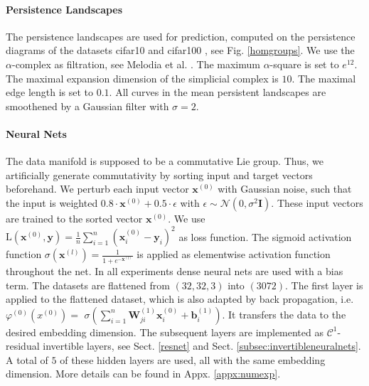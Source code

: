\documentclass[envcountsect,runningheads]{llncs}
\begin{document}
\paragraph{Persistence Landscapes} The persistence landscapes are used for prediction, computed on the persistence diagrams of the datasets cifar10 and cifar100 , see Fig. \ref{homgroups}. We use the $\alpha$-complex as filtration, see Melodia et al. . The maximum $\alpha$-square is set to $e^{12}$. The maximal expansion dimension of the simplicial complex is $10$. The maximal edge length is set to $0.1$. All curves in the mean persistent landscapes are smoothened by a Gaussian filter with $\sigma = 2$.


\paragraph{Neural Nets} The data manifold is supposed to be a commutative Lie group. Thus, we artificially generate commutativity by sorting input and target vectors beforehand. We perturb each input vector $\textbf{x}^{(0)}$ with Gaussian noise, such that the input is weighted $0.8 \cdot \textbf{x}^{(0)} + 0.5 \cdot \epsilon$ with $\epsilon \sim \mathcal{N}(0,\sigma^2 \mathbf{I})$. These input vectors are trained to the sorted vector $\textbf{x}^{(0)}$. We use $\text{L}(\textbf{x}^{(0)}, \textbf{y}) = \frac{1}{n} \sum_{i=1}^{n} \left(\textbf{x}^{(0)}_i-\textbf{y}_i\right)^2$ as loss function. The sigmoid activation function $\sigma(\mathbf{x}^{(l)}) = \frac{1}{1 + e^{-\mathbf{x}^{(l)}}}$ is applied as elementwise activation function throughout the net. In all experiments dense neural nets are used with a bias term. The datasets are flattened from $(32,32,3)$ into $(3072)$. The first layer is applied to the flattened dataset, which is also adapted by back propagation, i.e. $\varphi^{(0)}\left(x^{(0)} \right) =$ $\sigma\left( \sum_{i=1}^{n} \textbf{W}_{ji}^{(1)} \textbf{x}_{i}^{(0)} + \textbf{b}_{i}^{(1)} \right)$. It transfers the data to the desired embedding dimension. The subsequent layers are implemented as $\mathcal{C}^1$-residual invertible layers, see Sect. \ref{resnet} and Sect. \ref{subsec:invertibleneuralnets}. A total of $5$ of these hidden layers are used, all with the same embedding dimension. More details can be found in Appx. \ref{appx:numexp}.
\end{document}

